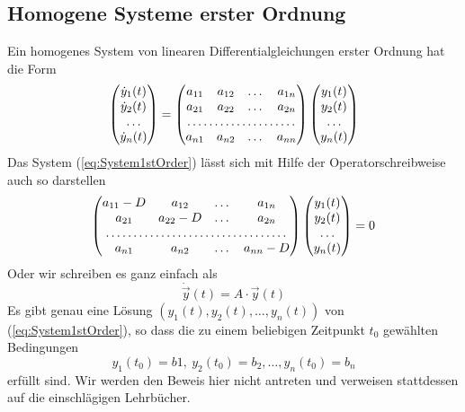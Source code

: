 \subsection{Homogene Systeme erster Ordnung}
Ein homogenes System von linearen Differentialgleichungen erster Ordnung hat
die Form
\begin{equation}
  \begin{pmatrix}
    \dot{y}_1(t)\\
    \dot{y}_2(t)\\
    \dots\\
    \dot{y}_n(t)
  \end{pmatrix}
  =
  \begin{pmatrix}
    a_{11}&a_{12}&\dots &a_{1n}\\
    a_{21}&a_{22}&\dots &a_{2n}\\
    \multicolumn{4}{c}\dotfill\\
    a_{n1}&a_{n2}&\dots &a_{nn}\\
  \end{pmatrix}
  \begin{pmatrix}
    y_1(t)\\
    y_2(t)\\
    \dots\\
    y_n(t)
  \end{pmatrix}
  \label{eq:System1stOrder}
\end{equation}
Das System (\ref{eq:System1stOrder}) lässt sich mit Hilfe der
Operatorschreibweise auch so darstellen
\begin{equation}
  \begin{pmatrix}
    a_{11}-D&a_{12}&\dots &a_{1n}\\
    a_{21}&a_{22}-D&\dots &a_{2n}\\
    \multicolumn{4}{c}\dotfill\\
    a_{n1}&a_{n2}&\dots &a_{nn}-D\\
  \end{pmatrix}
  \begin{pmatrix}
    y_1(t)\\
    y_2(t)\\
    \dots\\
    y_n(t)
  \end{pmatrix}
  =0
  \label{eq:System1stOperator}
\end{equation}
Oder wir schreiben es ganz einfach als
\begin{equation}
  \dot{\vec{y}}(t)=A\cdot\vec{y}(t)
  \label{eq:SystemVectorMatrixNotation}
\end{equation}
Es gibt genau eine Lösung $(y_1(t),y_2(t),\dots,y_n(t))$ von
(\ref{eq:System1stOrder}), so dass die zu einem beliebigen Zeitpunkt $t_0$
gewählten Bedingungen
\begin{equation}
  y_1(t_0)=b1,\:y_2(t_0)=b_2,\dots,y_n(t_0)=b_n
  \label{eq:ICsSystem}
\end{equation}
erfüllt sind. Wir werden den Beweis hier nicht antreten und verweisen
stattdessen auf die einschlägigen Lehrbücher.

